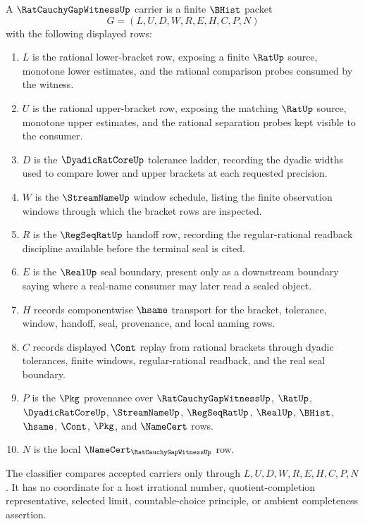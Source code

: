 \begin{definition}
\label{def:rat-cauchy-gap-witness-carrier}
A $\RatCauchyGapWitnessUp$ carrier is a finite $\BHist$ packet
$$
G=(L,U,D,W,R,E,H,C,P,N)
$$
with the following displayed rows:
\begin{enumerate}
\item $L$ is the rational lower-bracket row, exposing a finite $\RatUp$ source, monotone lower estimates, and the rational comparison probes consumed by the witness.
\item $U$ is the rational upper-bracket row, exposing the matching $\RatUp$ source, monotone upper estimates, and the rational separation probes kept visible to the consumer.
\item $D$ is the $\DyadicRatCoreUp$ tolerance ladder, recording the dyadic widths used to compare lower and upper brackets at each requested precision.
\item $W$ is the $\StreamNameUp$ window schedule, listing the finite observation windows through which the bracket rows are inspected.
\item $R$ is the $\RegSeqRatUp$ handoff row, recording the regular-rational readback discipline available before the terminal seal is cited.
\item $E$ is the $\RealUp$ seal boundary, present only as a downstream boundary saying where a real-name consumer may later read a sealed object.
\item $H$ records componentwise $\hsame$ transport for the bracket, tolerance, window, handoff, seal, provenance, and local naming rows.
\item $C$ records displayed $\Cont$ replay from rational brackets through dyadic tolerances, finite windows, regular-rational readback, and the real seal boundary.
\item $P$ is the $\Pkg$ provenance over $\RatCauchyGapWitnessUp$, $\RatUp$, $\DyadicRatCoreUp$, $\StreamNameUp$, $\RegSeqRatUp$, $\RealUp$, $\BHist$, $\hsame$, $\Cont$, $\Pkg$, and $\NameCert$ rows.
\item $N$ is the local $\NameCert_{\RatCauchyGapWitnessUp}$ row.
\end{enumerate}
The classifier compares accepted carriers only through $L,U,D,W,R,E,H,C,P,N$. It has no coordinate for a host irrational number, quotient-completion representative, selected limit, countable-choice principle, or ambient completeness assertion.
\end{definition}

